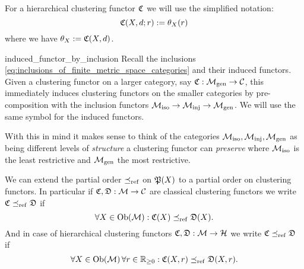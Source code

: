 For a hierarchical clustering functor $\Cf$ we will use the simplified notation:
$$
\Cf(X,d;r) := \theta_X(r)
$$
where we have $\theta_X := \Cf(X,d)$.


\begin{myremark}{}{induced_functor_by_inclusion}
Recall the inclusions \eqref{eq:inclusions_of_finite_metric_space_categories} and their induced functors.
Given a clustering functor on a larger category, say $\Cf: \gen \to \C$, this immediately induces clustering functors on the smaller categories by pre-composition with the inclusion functors $\iso \to \inj \to \gen$. We will use the same symbol for the induced functors.
\end{myremark}

With this in mind it makes sense to think of the categories $\iso, \inj, \gen$ as being different levels of \emph{structure} a clustering functor can \emph{preserve} where $\iso$ is the least restrictive and $\gen$ the most restrictive.


\begin{myremark}{}{}
We can extend the partial order $\refines$ on $\P(X)$ to a partial order on clustering functors.
In particular if $\Cf, \mathfrak{D}: \M \to \C$ are classical clustering functors we write $\Cf \refines \mathfrak{D}$ if
\begin{equation*}
    \forall X \in \ob(\M): \Cf(X) \refines \mathfrak{D}(X).
\end{equation*}
And in case of hierarchical clustering functors $\Cf, \mathfrak{D}: \M \to \H$ we write $\Cf \refines \mathfrak{D}$ if
\begin{equation*}
    \forall X \in \ob(\M) \, \forall r \in \R_{\geq0}: \Cf(X,r) \refines \mathfrak{D}(X,r).
\end{equation*}
\end{myremark}